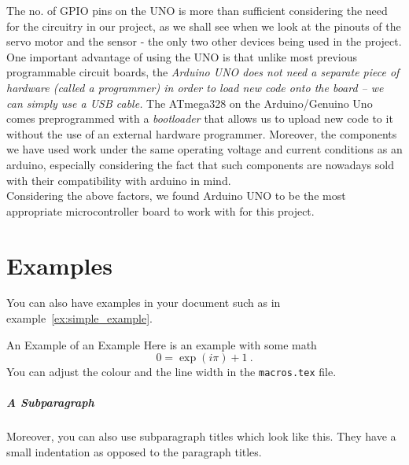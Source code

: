  The no. of GPIO pins on the UNO is more than sufficient considering the need for the circuitry in our project, as we shall see when we look at the pinouts of the servo motor and the sensor \-- the only two other devices being used in the project. \vspace{0.1cm} \linebreak
 One important advantage of using the UNO is that unlike most previous programmable circuit boards, the \textit{Arduino UNO does not need a separate piece of hardware (called a programmer) in order to load new code onto the board – we can simply use a USB cable.} The ATmega328 on the Arduino/Genuino Uno comes preprogrammed with a \textit{bootloader} that allows us to upload new code to it without the use of an external hardware programmer. \vspace{0.1cm} \linebreak
 Moreover, the components we have used work under the same operating voltage and current conditions as an arduino, especially considering the fact that such components are nowadays sold with their compatibility with arduino in mind.\\
 
 Considering the above factors, we found Arduino UNO to be the most appropriate microcontroller board to work with for this project.\\
 
\section{Examples}
You can also have examples in your document such as in example~\ref{ex:simple_example}.
\begin{example}{An Example of an Example}
  \label{ex:simple_example}
  Here is an example with some math
  \begin{equation}
    0 = \exp(i\pi)+1\ .
  \end{equation}
  You can adjust the colour and the line width in the {\tt macros.tex} file.
\end{example}


\subparagraph{A Subparagraph} Moreover, you can also use subparagraph titles which look like this. They have a small indentation as opposed to the paragraph titles.


